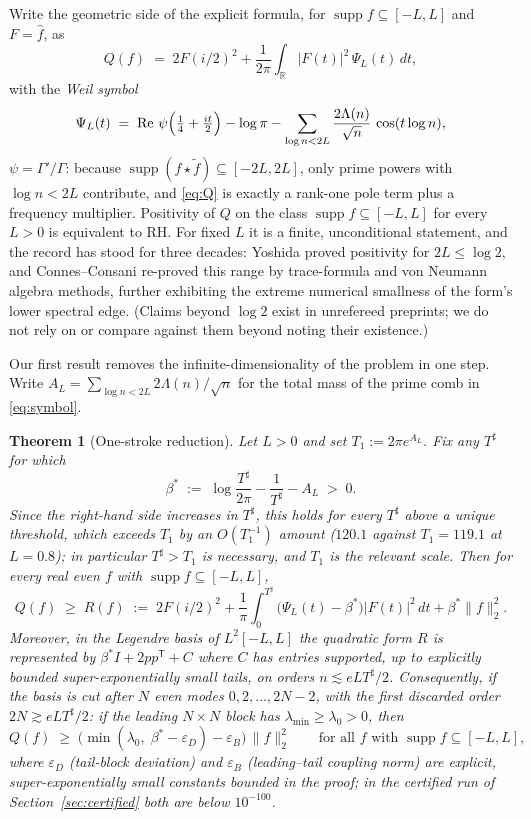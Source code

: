 ﻿\documentclass[11pt]{article}
\newtheorem{theorem}{Theorem}[section]
\newcommand{\R}{\mathbb{R}}
\newcommand{\supp}{\operatorname{supp}}
\newcommand{\Rey}{\operatorname{Re}}
\newcommand{\lammin}{\lambda_{\min}}
\newcommand{\Tsharp}{T^{\sharp}}
\newcommand{\fhat}{\hat f}
\begin{document}
Write the geometric side of the explicit formula, for
$\supp f\subseteq[-L,L]$ and $F=\fhat$, as
\begin{equation}\label{eq:Q}
Q(f)\;=\;2F(i/2)^2
+\frac1{2\pi}\int_{\R}|F(t)|^2\,\Psi_L(t)\,dt,
\end{equation}
with the \emph{Weil symbol}
\begin{equation}\label{eq:symbol}
\Psi_L(t)\;=\;\Rey\,\psi\Bigl(\tfrac14+\tfrac{it}2\Bigr)-\log\pi
-\sum_{\log n<2L}\frac{2\Lambda(n)}{\sqrt n}\,\cos(t\log n),
\end{equation}
$\psi=\Gamma'/\Gamma$: because $\supp(f\star\tilde f)\subseteq[-2L,2L]$,
only prime powers with $\log n<2L$ contribute, and \eqref{eq:Q} is
exactly a rank-one pole term plus a frequency multiplier.
Positivity of $Q$ on the class $\supp f\subseteq[-L,L]$ for every $L>0$
is equivalent to RH.  For fixed $L$ it is a finite, unconditional
statement, and the record has stood for three decades: Yoshida
\cite{Yoshida1992} proved positivity for $2L\le\log2$, and
Connes--Consani \cite{ConnesConsani2021} re-proved this range by
trace-formula and von Neumann algebra methods, further exhibiting the
extreme numerical smallness of the form's lower spectral edge.
(Claims beyond $\log2$ exist in unrefereed preprints; we do not rely on
or compare against them beyond noting their existence.)

Our first result removes the infinite-dimensionality of the problem in
one step.  Write $A_L=\sum_{\log n<2L}2\Lambda(n)/\sqrt n$ for the
total mass of the prime comb in \eqref{eq:symbol}.

\begin{theorem}[One-stroke reduction]\label{thm:reduction}
Let $L>0$ and set $T_1:=2\pi e^{A_L}$.  Fix any $\Tsharp$ for which
\[
\beta^*\;:=\;\log\frac{\Tsharp}{2\pi}-\frac1{\Tsharp}-A_L\;>\;0 .
\]
Since the right-hand side increases in $\Tsharp$, this holds for every
$\Tsharp$ above a unique threshold, which exceeds $T_1$ by an
$O(T_1^{-1})$ amount ($120.1$ against $T_1=119.1$ at $L=0.8$); in
particular $\Tsharp>T_1$ is necessary, and $T_1$ is the relevant scale.
Then for every real even $f$ with $\supp f\subseteq[-L,L]$,
\begin{equation}\label{eq:R}
Q(f)\;\ge\;R(f)\;:=\;2F(i/2)^2
+\frac1\pi\int_0^{\Tsharp}\bigl(\Psi_L(t)-\beta^*\bigr)|F(t)|^2\,dt
+\beta^*\|f\|_2^2 .
\end{equation}
Moreover, in the Legendre basis of $L^2[-L,L]$ the quadratic form $R$
is represented by $\beta^*I+2pp^{\mathsf T}+C$ where $C$ has entries
supported, up to explicitly bounded super-exponentially small tails, on
orders $n\lesssim eL\Tsharp/2$.  Consequently, if the basis is cut
after $N$ even modes $0,2,\dots,2N-2$, with the first discarded order
$2N\gtrsim eL\Tsharp/2$: if the leading $N\times N$ block has
$\lammin\ge\lambda_0>0$, then
\[
Q(f)\;\ge\;\bigl(\min(\lambda_0,\;\beta^*-\varepsilon_D)
-\varepsilon_B\bigr)\,\|f\|_2^2
\qquad\text{for all }f\text{ with }\supp f\subseteq[-L,L],
\]
where $\varepsilon_D$ (tail-block deviation) and $\varepsilon_B$
(leading--tail coupling norm) are explicit, super-exponentially small
constants bounded in the proof; in the certified run of
Section~\ref{sec:certified} both are below $10^{-100}$.
\end{theorem}
\end{document}
